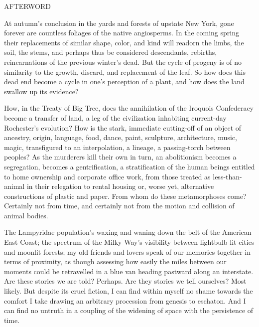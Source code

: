 \documentclass[12pt]{article}
\begin{document}
\vspace*{15\baselineskip}

\begingroup
\begin{center}
\huge AFTERWORD
\end{center}
\endgroup

\begingroup
\hspace{5mm} At autumn's conclusion in the yards and forests of upstate New York, gone forever are countless foliages of the native angiosperms. In the coming spring their replacements of similar shape, color, and kind will readorn the limbs, the soil, the stems, and perhaps thus be considered descendants, rebirths, reincarnations of the previous winter's dead. But the cycle of progeny is of no similarity to the growth, discard, and replacement of the leaf. So how does this dead end become a cycle in one's perception of a plant, and how does the land swallow up its evidence? \\
\endgroup

\begingroup
\hspace{5mm} How, in the Treaty of Big Tree, does the annihilation of the Iroquois Confederacy become a transfer of land, a leg of the civilization inhabiting current-day Rochester's evolution? How is the stark, immediate cutting-off of an object of ancestry, origin, language, food, dance, paint, sculpture, architecture, music, magic, transfigured to an interpolation, a lineage, a passing-torch between peoples? As the murderers kill their own in turn, an abolitionism becomes a segregation, becomes a gentrification, a stratification of the human beings entitled to home ownership and corporate office work, from those treated as less-than-animal in their relegation to rental housing or, worse yet, alternative constructions of plastic and paper. From whom do these metamorphoses come? Certainly not from time, and certainly not from the motion and collision of animal bodies. \\
\endgroup

\begingroup
\hspace{5mm} The Lampyridae population's waxing and waning down the belt of the American East Coast; the spectrum of the Milky Way's visibility between lightbulb-lit cities and moonlit forests; my old friends and lovers speak of our memories together in terms of proximity, as though assessing how easily the miles between our moments could be retravelled in a blue van heading pastward along an interstate. Are these stories we are told? Perhaps. Are they stories we tell ourselves? Most likely. But despite its cruel fiction, I can find within myself no shame towards the comfort I take drawing an arbitrary procession from genesis to eschaton. And I can find no untruth in a coupling of the widening of space with the persistence of time. \\
\endgroup
\end{document}
